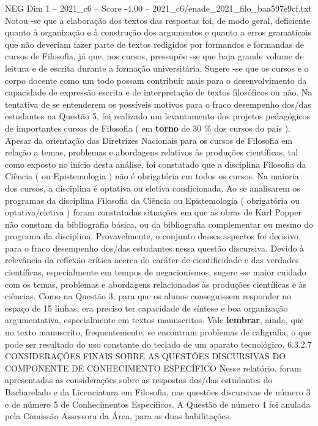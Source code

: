 \begin{textsample}{NEG Dim 1 – 2021\_c6 – Score -4.00 – 2021\_c6/enade\_2021\_filo\_baa597e9cf.txt}
Notou -se que a elaboração dos textos das respostas foi, de modo geral, deficiente quanto à organização e à construção dos argumentos e quanto a erros gramaticais que não deveriam fazer parte de textos redigidos por formandos e formandas de cursos de Filosofia, já que, nos cursos, pressupõe -se que haja grande volume de leitura e de escrita durante a formação universitária.
Sugere -se que os cursos e o corpo docente como um todo possam contribuir mais para o desenvolvimento da capacidade de expressão escrita e de interpretação de textos filosóficos ou não.
Na tentativa de se entenderem os possíveis motivos para o fraco desempenho dos/das estudantes na Questão 5, foi realizado um levantamento dos projetos pedagógicos de importantes cursos de Filosofia ( em \textbf{torno} de 30 \% dos cursos do país ).
Apesar da orientação das Diretrizes Nacionais para os cursos de Filosofia em relação a temas, problemas e abordagens relativos às produções científicas, tal como exposto no início desta análise, foi constatado que a disciplina Filosofia da Ciência ( ou Epistemologia ) não é obrigatória em todos os cursos.
Na maioria dos cursos, a disciplina é optativa ou eletiva condicionada.
Ao se analisarem os programas da disciplina Filosofia da Ciência ou Epistemologia ( obrigatória ou optativa/eletiva ) foram constatadas situações em que as obras de Karl Popper não constam da bibliografia básica, ou da bibliografia complementar ou mesmo do programa da disciplina.
Provavelmente, o conjunto desses aspectos foi decisivo para o fraco desempenho dos/das estudantes nessa questão discursiva.
Devido à relevância da reflexão crítica acerca do caráter de cientificidade e das verdades científicas, especialmente em tempos de negacionismos, sugere -se maior cuidado com os temas, problemas e abordagens relacionados às produções científicas e às ciências.
Como na Questão 3, para que os alunos conseguissem responder no espaço de 15 linhas, era preciso ter capacidade de síntese e boa organização argumentativa, especialmente em textos manuscritos.
Vale \textbf{lembrar}, ainda, que no texto manuscrito, frequentemente, se encontram problemas de caligrafia, o que pode ser resultado do uso constante do teclado de um aparato tecnológico. 6.3.2.7 CONSIDERAÇÕES FINAIS SOBRE AS QUESTÕES DISCURSIVAS DO COMPONENTE DE CONHECIMENTO ESPECÍFICO Nesse relatório, foram apresentadas as considerações sobre as respostas dos/das estudantes do Bacharelado e da Licenciatura em Filosofia, nas questões discursivas de número 3 e de número 5 de Conhecimentos Específicos.
A Questão de número 4 foi anulada pela Comissão Assessora da Área, para as duas habilitações.

\end{textsample}
